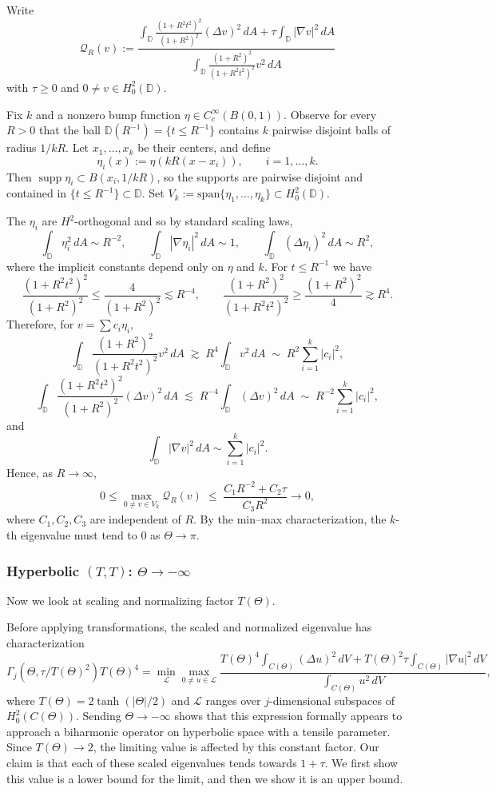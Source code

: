 \documentclass[11pt]{amsart}
\theoremstyle{definition}
\numberwithin{equation}{section}
\newcommand{\lapl}{\Delta}
\newcommand{\grad}{\nabla}
\newcommand{\D}{\mathbb{D}}
\begin{document}
Write
\[
\mathcal{Q}_R(v):=
\frac{\displaystyle \int_{\D}\frac{(1+R^2t^2)^2}{(1+R^2)^2}(\Delta v)^2\,dA
+\tau\int_{\D}|\nabla v|^2\,dA}
{\displaystyle \int_{\D}\frac{(1+R^2)^2}{(1+R^2t^2)^2}v^2\,dA}
\]
with \(\tau \geq 0\) and \(0 \neq v \in H_0^2(\D)\).

Fix \(k\) and a nonzero bump function \(\eta\in C_c^\infty(B(0,1))\).
Observe for every \(R>0\) that the ball
$\D(R^{-1})=\{t \leq R^{-1}\}$ contains \(k\) pairwise disjoint balls of radius
\(1/kR\). Let \(x_1,\dots,x_k\) be their centers, and define
\[
\eta_i(x):=\eta\!\left(kR(x-x_i)\right), \qquad i=1,\dots,k.
\]
Then \(\operatorname{supp}\eta_i\subset B(x_i,1/kR)\), so the supports are
pairwise disjoint and contained in \(\{t\le R^{-1}\}\subset\D\).
Set \(V_k:=\mathrm{span}\{\eta_1,\dots,\eta_k\}\subset H_0^2(\D)\).

The $\eta_i$ are $H^2$-orthogonal and so by standard scaling laws,
\[
\int_\D \eta_i^2\,dA \sim R^{-2},\qquad
\int_\D |\nabla \eta_i|^2\,dA \sim 1,\qquad
\int_\D (\Delta \eta_i)^2\,dA \sim R^{2},
\]
where the implicit constants depend only on \(\eta\) and \(k\).
For \(t \le R^{-1}\) we have
\[
\frac{(1+R^2t^2)^2}{(1+R^2)^2}\le \frac{4}{(1+R^2)^2}\lesssim R^{-4},
\qquad
\frac{(1+R^2)^2}{(1+R^2t^2)^2}\ge \frac{(1+R^2)^2}{4}\gtrsim R^{4}.
\]
Therefore, for \(v=\sum c_i\eta_i\),
\[
\int_{\D}\frac{(1+R^2)^2}{(1+R^2t^2)^2}v^2\,dA
\;\gtrsim\;
R^4\int_\D v^2\,dA
\;\sim\;
R^2\sum_{i=1}^k|c_i|^2,
\]
\[
\int_{\D}\frac{(1+R^2t^2)^2}{(1+R^2)^2}(\Delta v)^2\,dA
\;\lesssim\;
R^{-4}\int_\D (\Delta v)^2\,dA
\;\sim\;
R^{-2}\sum_{i=1}^k|c_i|^2,
\]
and
\[
\int_\D |\nabla v|^2\,dA \sim \sum_{i=1}^k|c_i|^2.
\]
Hence, as $R \to \infty$,
\[
0 \leq \max_{0\neq v\in V_{k}} \mathcal{Q}_R(v)
\;\le\;
\frac{C_1R^{-2}+C_2\tau}{C_3R^2}
\to 0,
\]
where \(C_1,C_2,C_3\) are independent of \(R\).
By the min--max characterization, the $k$-th eigenvalue must tend to \(0\) as \(\Theta\to\pi\).
\subsubsection*{Hyperbolic $(T,T)$: $\Theta \to -\infty$}

Now we look at scaling and normalizing factor $T(\Theta)$.

Before applying transformations, the scaled and normalized eigenvalue has characterization
\begin{equation}\label{eq:vibratingmanifoldrq}
\Gamma_j(\Theta, \tau/T(\Theta)^2)T(\Theta)^4 = \min_{\mathcal{L}}\max_{0 \neq u \in \mathcal{L}}\dfrac{T(\Theta)^4\displaystyle \int_{C(\Theta)} (\lapl u)^2 \, dV +  T(\Theta)^2 \tau\int_{C(\Theta)} |\grad u|^2 \, dV} {\displaystyle \int_{C(\Theta)}  u^2 \, dV},
\end{equation}
where $T(\Theta) = 2\tanh(|\Theta|/2)$ and $\mathcal{L}$ ranges over $j$-dimensional subspaces of $H_0^2(C(\Theta))$.
Sending $\Theta \to -\infty$ shows that this expression formally appears to approach a biharmonic operator on hyperbolic space with a tensile parameter. Since $T(\Theta)\to 2$, the limiting value is affected by this constant factor. Our claim is that each of these scaled eigenvalues tends towards $1 + \tau$.
We first show this value is a lower bound for the limit, and then we show it is an upper bound.
\end{document}
